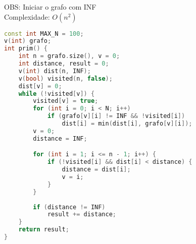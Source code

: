 OBS: Iniciar o grafo com INF\\
Complexidade: \(O(n^{2})\)
\begin{lstlisting}[language=C++]
const int MAX_N = 100;
v(int) grafo;
int prim() {
	int n = grafo.size(), v = 0;
	int distance, result = 0;
	v(int) dist(n, INF);
	v(bool) visited(n, false);
	dist[v] = 0;
	while (!visited[v]) {
		visited[v] = true;
		for (int i = 0; i < N; i++)
            if (grafo[v][i] != INF && !visited[i])
                dist[i] = min(dist[i], grafo[v][i]);
		v = 0;
		distance = INF;

		for (int i = 1; i <= n - 1; i++) {
            if (!visited[i] && dist[i] < distance) {
                distance = dist[i];
                v = i;
            }
		}
		
		if (distance != INF)
		    result += distance;
	}
	return result;
}
\end{lstlisting}